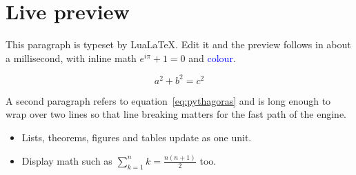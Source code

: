 \documentclass{article}
\begin{document}
\section{Live preview}
This paragraph is typeset by LuaLaTeX. Edit it and the preview follows in about a
millisecond, with inline math $e^{i\pi} + 1 = 0$ and \textcolor{blue}{colour}.

\begin{equation}\label{eq:pythagoras}
  a^2 + b^2 = c^2
\end{equation}

A second paragraph refers to equation~\eqref{eq:pythagoras} and is long enough to wrap
over two lines so that line breaking matters for the fast path of the engine.

\begin{itemize}
  \item Lists, theorems, figures and tables update as one unit.
  \item Display math such as $\sum_{k=1}^{n} k = \frac{n(n+1)}{2}$ too.
\end{itemize}


\end{document}
